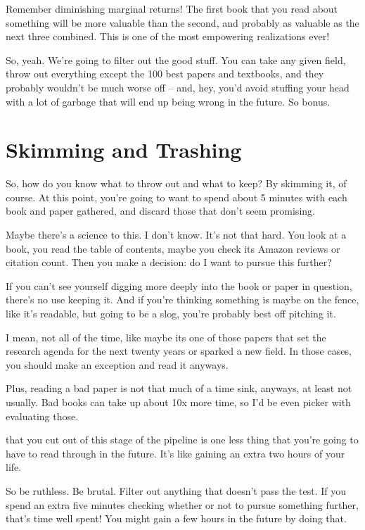 Remember diminishing marginal returns! The first book that you read about something will
be more valuable than the second, and probably as valuable as the next three
combined. This is one of the most empowering realizations ever!


So, yeah. We're going to filter out the good stuff. You can take any given
field, throw out everything except the 100 best papers and textbooks, and they
probably wouldn't be much worse off -- and, hey, you'd avoid stuffing your head
with a lot of garbage that will end up being wrong in the future. So bonus.

\section{Skimming and Trashing}

So, how do you know what to throw out and what to keep? By skimming it, of
course. At this point, you're going to want to spend about 5 minutes with each
book and paper gathered, and discard those that don't seem promising.

Maybe there's a science to this. I don't know. It's not that hard. You look at a
book, you read the table of contents, maybe you check its Amazon reviews or
citation count. Then you make a decision: do I want to pursue this further?

If you can't see yourself digging more deeply into the book or paper in
question, there's no use keeping it. And if you're thinking something is maybe on
the fence, like it's readable, but going to be a slog, you're probably best off
pitching it.

I mean, not all of the time, like maybe its one of those papers that set the research
agenda for the next twenty years or sparked a new field. In those cases, you
should make an exception and read it anyways.

Plus, reading a bad paper is not that much of a time sink, anyways, at least not
usually. Bad books can take up about 10x more time, so I'd be even picker with
evaluating those.

 that you cut out of this stage of the
pipeline is one less thing that you're going to have to read through in the
future. It's like gaining an extra two hours of your life.

So be ruthless. Be brutal. Filter out anything that doesn't pass the test. If
you spend an extra five minutes checking whether or not to pursue something
further, that's time well spent! You might gain a few hours in the future by
doing that.

